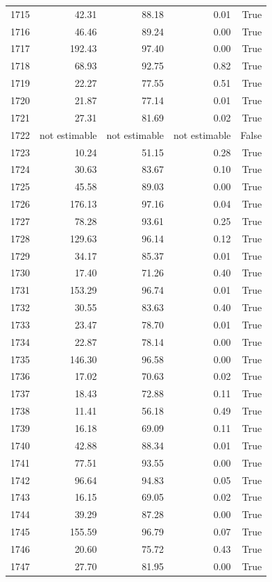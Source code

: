 \begin{longtable}{rrrrr}
1715 & 42.31 & 88.18 & 0.01 & True \\
1716 & 46.46 & 89.24 & 0.00 & True \\
1717 & 192.43 & 97.40 & 0.00 & True \\
1718 & 68.93 & 92.75 & 0.82 & True \\
1719 & 22.27 & 77.55 & 0.51 & True \\
1720 & 21.87 & 77.14 & 0.01 & True \\
1721 & 27.31 & 81.69 & 0.02 & True \\
1722 & not estimable & not estimable & not estimable & False \\
1723 & 10.24 & 51.15 & 0.28 & True \\
1724 & 30.63 & 83.67 & 0.10 & True \\
1725 & 45.58 & 89.03 & 0.00 & True \\
1726 & 176.13 & 97.16 & 0.04 & True \\
1727 & 78.28 & 93.61 & 0.25 & True \\
1728 & 129.63 & 96.14 & 0.12 & True \\
1729 & 34.17 & 85.37 & 0.01 & True \\
1730 & 17.40 & 71.26 & 0.40 & True \\
1731 & 153.29 & 96.74 & 0.01 & True \\
1732 & 30.55 & 83.63 & 0.40 & True \\
1733 & 23.47 & 78.70 & 0.01 & True \\
1734 & 22.87 & 78.14 & 0.00 & True \\
1735 & 146.30 & 96.58 & 0.00 & True \\
1736 & 17.02 & 70.63 & 0.02 & True \\
1737 & 18.43 & 72.88 & 0.11 & True \\
1738 & 11.41 & 56.18 & 0.49 & True \\
1739 & 16.18 & 69.09 & 0.11 & True \\
1740 & 42.88 & 88.34 & 0.01 & True \\
1741 & 77.51 & 93.55 & 0.00 & True \\
1742 & 96.64 & 94.83 & 0.05 & True \\
1743 & 16.15 & 69.05 & 0.02 & True \\
1744 & 39.29 & 87.28 & 0.00 & True \\
1745 & 155.59 & 96.79 & 0.07 & True \\
1746 & 20.60 & 75.72 & 0.43 & True \\
1747 & 27.70 & 81.95 & 0.00 & True \\

\end{longtable}
